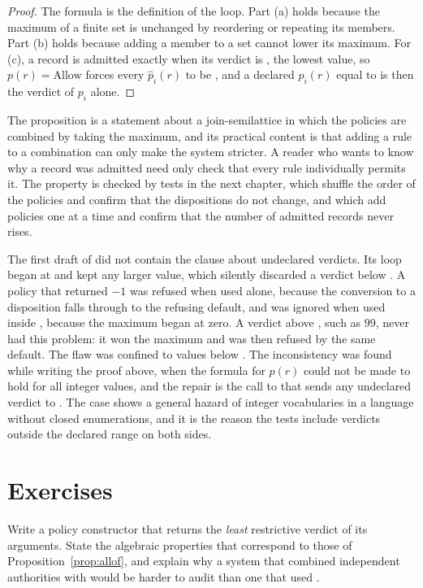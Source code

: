 \begin{proof}
The formula is the definition of the loop. Part (a) holds because the maximum of a finite set is unchanged by reordering or repeating its members. Part (b) holds because adding a member to a set cannot lower its maximum. For (c), a record is admitted exactly when its verdict is , the lowest value, so $p(r)=\mathrm{Allow}$ forces every $\hat p_i(r)$ to be , and a declared $p_i(r)$ equal to  is then the verdict of $p_i$ alone.
\end{proof}

The proposition is a statement about a join-semilattice in which the policies are combined by taking the maximum, and its practical content is that adding a rule to a combination can only make the system stricter. A reader who wants to know why a record was admitted need only check that every rule individually permits it. The property is checked by tests in the next chapter, which shuffle the order of the policies and confirm that the dispositions do not change, and which add policies one at a time and confirm that the number of admitted records never rises.

The first draft of  did not contain the clause about undeclared verdicts. Its loop began at  and kept any larger value, which silently discarded a verdict below . A policy that returned $-1$ was refused when used alone, because the conversion to a disposition falls through to the refusing default, and was ignored when used inside , because the maximum began at zero. A verdict above , such as $99$, never had this problem: it won the maximum and was then refused by the same default. The flaw was confined to values below . The inconsistency was found while writing the proof above, when the formula for $p(r)$ could not be made to hold for all integer values, and the repair is the call to  that sends any undeclared verdict to . The case shows a general hazard of integer vocabularies in a language without closed enumerations, and it is the reason the tests include verdicts outside the declared range on both sides.

\section*{Exercises}

\begin{exercise}
Write a policy constructor  that returns the \emph{least} restrictive verdict of its arguments. State the algebraic properties that correspond to those of Proposition~\ref{prop:allof}, and explain why a system that combined independent authorities with  would be harder to audit than one that used .
\end{exercise}

